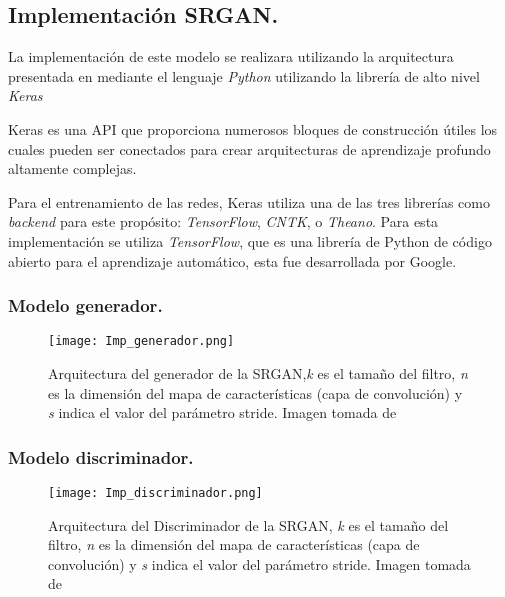 \subsection{Implementación SRGAN.}

La implementación de este modelo se realizara utilizando la arquitectura presentada
en \cite{SRGAN} mediante el lenguaje \emph{Python} utilizando la librería de alto nivel \emph{Keras}

Keras es una API que proporciona numerosos bloques
de construcción útiles los cuales pueden ser conectados para crear arquitecturas de
aprendizaje profundo altamente complejas.

Para el entrenamiento de las redes, Keras utiliza una de las tres librerías como
\emph{backend} para este propósito: \emph{TensorFlow}, \emph{CNTK}, o \emph{Theano}. Para esta implementación
se utiliza \emph{TensorFlow}, que es una librería de Python de código abierto para el
aprendizaje automático, esta fue desarrollada por Google.


\subsubsection{Modelo generador.}

\begin{figure}[H]
  \begin{center}
    \texttt{[image: Imp\_generador.png]}
    \caption{Arquitectura del generador de la SRGAN,\emph{k} es el tamaño del
    filtro, \emph{n} es la dimensión del mapa de características (capa de convolución) y \emph{s} indica
    el valor del parámetro stride. Imagen tomada de \cite{SRGAN}}
    \label{Alexis4}
  \end{center}
\end{figure}

\subsubsection{Modelo discriminador.}

\begin{figure}[H]
  \begin{center}
    \texttt{[image: Imp\_discriminador.png]}
    \caption{Arquitectura del Discriminador de la SRGAN, \emph{k} es el tamaño
    del filtro, \emph{n} es la dimensión del mapa de características (capa de convolución) y \emph{s}
    indica el valor del parámetro stride. Imagen tomada de \cite{SRGAN}}
    \label{Alexis5}
  \end{center}
\end{figure}

